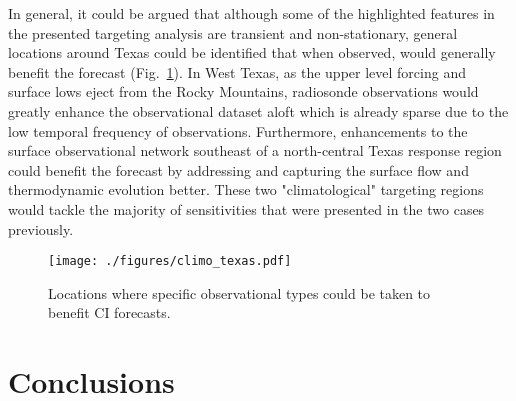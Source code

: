 \documentclass{ttuthes2007}
\newcommand{\tab}{\hspace*{2em}}  %
\begin{document}
\tab In general, it could be argued that although some of the highlighted features in the presented targeting analysis are transient and non-stationary, general locations around Texas could be identified that when observed, would generally benefit the forecast (Fig.~\ref{schematic}). In West Texas, as the upper level forcing and surface lows eject from the Rocky Mountains, radiosonde observations would greatly enhance the observational dataset aloft which is already sparse due to the low temporal frequency of observations. Furthermore, enhancements to the surface observational network southeast of a north-central Texas response region could benefit the forecast by addressing and capturing the surface flow and thermodynamic evolution better. These two "climatological" targeting regions would tackle the majority of sensitivities that were presented in the two cases previously. 

\begin{figure}[!tb]
  \centering
  \noindent\texttt{[image: ./figures/climo\_texas.pdf]}\\
  \caption{Locations where specific observational types could be taken to benefit CI forecasts.}
\label{schematic}
\end{figure}

\chapter{Conclusions}
\end{document}
